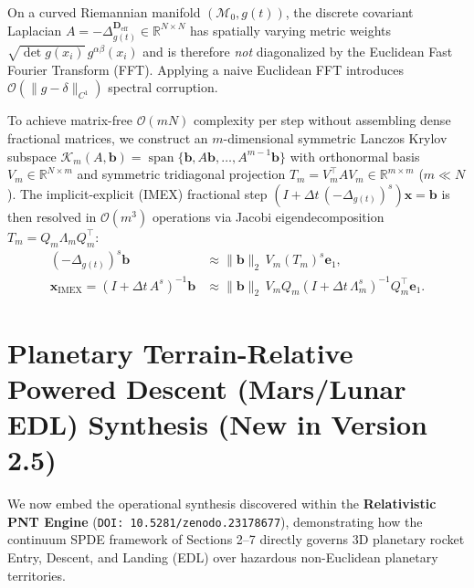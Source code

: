 \documentclass[11pt,a4paper,reqno]{article}
\theoremstyle{definition}
\theoremstyle{remark}
\begin{document}
On a curved Riemannian manifold $(\mathcal{M}_0, g(t))$, the discrete covariant Laplacian $A = -\Delta_{g(t)}^{\mathbf{D}_{\mathrm{eff}}} \in \mathbb{R}^{N \times N}$ has spatially varying metric weights $\sqrt{\det g(x_i)}\,g^{\alpha\beta}(x_i)$ and is therefore \emph{not} diagonalized by the Euclidean Fast Fourier Transform (FFT). Applying a naive Euclidean FFT introduces $\mathcal{O}(\|g - \delta\|_{C^1})$ spectral corruption.

To achieve matrix-free $\mathcal{O}(m N)$ complexity per step without assembling dense fractional matrices, we construct an $m$-dimensional symmetric Lanczos Krylov subspace $\mathcal{K}_m(A, \mathbf{b}) = \operatorname{span}\{\mathbf{b}, A\mathbf{b}, \dots, A^{m-1}\mathbf{b}\}$ \cite{saad1992analysis, higham2008functions} with orthonormal basis $V_m \in \mathbb{R}^{N \times m}$ and symmetric tridiagonal projection $T_m = V_m^\top A V_m \in \mathbb{R}^{m \times m}$ ($m \ll N$). The implicit-explicit (IMEX) fractional step $(I + \Delta t\,(-\Delta_{g(t)})^s)\mathbf{x} = \mathbf{b}$ is then resolved in $\mathcal{O}(m^3)$ operations via Jacobi eigendecomposition $T_m = Q_m \Lambda_m Q_m^\top$:
\begin{align}\label{eq:krylov_imex}
  (-\Delta_{g(t)})^s \mathbf{b} &\approx \|\mathbf{b}\|_2\, V_m (T_m)^s \mathbf{e}_1, \nonumber \\
  \mathbf{x}_{\mathrm{IMEX}} = \left(I + \Delta t\,A^s\right)^{-1}\mathbf{b} &\approx \|\mathbf{b}\|_2\, V_m Q_m \left(I + \Delta t\,\Lambda_m^s\right)^{-1} Q_m^\top \mathbf{e}_1.
\end{align}

\section{Planetary Terrain-Relative Powered Descent (Mars/Lunar EDL) Synthesis (New in Version 2.5)}

We now embed the operational synthesis discovered within the \textbf{Relativistic PNT Engine} (\texttt{DOI: 10.5281/zenodo.23178677}), demonstrating how the continuum SPDE framework of Sections 2--7 directly governs 3D planetary rocket Entry, Descent, and Landing (EDL) over hazardous non-Euclidean planetary territories.
\end{document}
